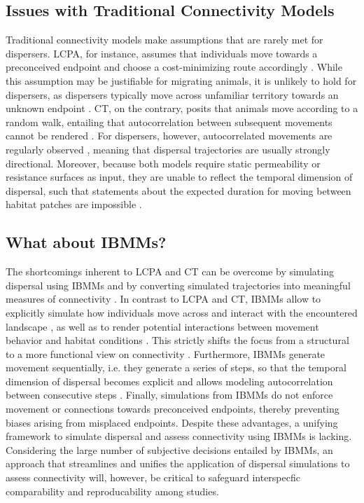 \documentclass[abstract=on,10pt,a4paper,bibliography=totocnumbered]{article}
\begin{document}
\subsection{Issues with Traditional Connectivity Models}
Traditional connectivity models make assumptions that are rarely met for
dispersers. LCPA, for instance, assumes that individuals move towards a
preconceived endpoint and choose a cost-minimizing route accordingly
\citep{Sawyer.2011, Abrahms.2017}. While this assumption may be justifiable for
migrating animals, it is unlikely to hold for dispersers, as dispersers
typically move across unfamiliar territory towards an unknown endpoint
\citep{Koen.2014, Cozzi.2020}. CT, on the contrary, posits that animals move
according to a random walk, entailing that autocorrelation between subsequent
movements cannot be rendered \citep{Diniz.2019}. For dispersers, however,
autocorrelated movements are regularly observed \citep{Cozzi.2020,
Hofmann.2021}, meaning that dispersal trajectories are usually strongly
directional. Moreover, because both models require static permeability or
resistance surfaces as input, they are unable to reflect the temporal dimension
of dispersal, such that statements about the expected duration for moving
between habitat patches are impossible \citep{Martensen.2017, Diniz.2019}.

\subsection{What about IBMMs?}
The shortcomings inherent to LCPA and CT can be overcome by simulating dispersal
using IBMMs and by converting simulated trajectories into meaningful measures of
connectivity \citep{Diniz.2019}. In contrast to LCPA and CT, IBMMs allow to
explicitly simulate how individuals move across and interact with the
encountered landscape \citep{Kanagaraj.2013, Clark.2015, Allen.2016,
Hauenstein.2019, Zeller.2020}, as well as to render potential interactions
between movement behavior and habitat conditions \citep{Avgar.2016}. This
strictly shifts the focus from a structural to a more functional view on
connectivity \citep{Tischendorf.2000, Kanagaraj.2013, Hauenstein.2019}.
Furthermore, IBMMs generate movement sequentially, i.e. they generate a series
of steps, so that the temporal dimension of dispersal becomes explicit and
allows modeling autocorrelation between consecutive steps \citep{Diniz.2019}.
Finally, simulations from IBMMs do not enforce movement or connections towards
preconceived endpoints, thereby preventing biases arising from misplaced
endpoints. Despite these advantages, a unifying framework to simulate dispersal
and assess connectivity using IBMMs is lacking. Considering the large number of
subjective decisions entailed by IBMMs, an approach that streamlines and unifies
the application of dispersal simulations to assess connectivity will, however,
be critical to safeguard interspecfic comparability and reproducability among
studies.
\end{document}
